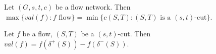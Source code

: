 \vspace{0.5cm}
\begin{theorem}
    Let $(G,s,t,c)$ be a flow network. Then $\max\{val(f):f\text{ flow}\}=\min\{c(S,T):(S,T) \text{ is a } (s,t)\text{-cut}\}$.
\end{theorem}
\vspace{0.5cm}
\begin{lemma}
    Let $f$ be a flow, $(S,T)$ be a $(s,t)$-cut. Then $val(f)=f(\delta^+(S))-f(\delta^-(S))$.
\end{lemma}